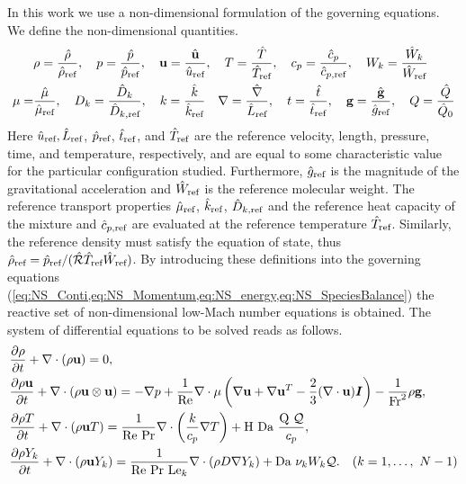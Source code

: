 In this work we use a non-dimensional formulation of the governing equations. We define the non-dimensional quantities.
\begin{align*}
&\rho = \frac{\hat \rho}{\hat \rho_{\text{ref}}}, \quad 
p = \frac{\hat p}{\hat p_{\text{ref}}}, \quad 
\textbf{u}= \frac{\hat{\textbf{u}}}{\hat u_{\text{ref}}}, \quad 
T = \frac{\hat T}{\hat T_{\text{ref}}},  \quad 
c_p = \frac{\hat c_p}{\hat c_{p,\text{ref}}}, \quad
W_k = \frac{\hat{W}_k}{\hat W_{\text{ref}}}
\\
\mu = &\frac{\hat \mu}{\hat \mu_{\text{ref}}},\quad
D_k = \frac{\hat D_k}{\hat D_{k,\text{ref}}}, \quad
k = \frac{\hat k}{\hat k_{\text{ref}}}\quad
\nabla = \frac{\hat \nabla}{\hat L_{\text{ref}}}, \quad
t = \frac{\hat{t}}{\hat t_{\text{ref}}},\quad 
\textbf{g} = \frac{\hat{\textbf{g}}}{\hat g_{\text{ref}}},\quad
Q = \frac{\hat Q}{\hat{Q}_0}
\end{align*}
Here $\hat u_{\text{ref}}, \hat L_{\text{ref}}$, $\hat p_{\text{ref}}$, $\hat t_{\text{ref}}$, and $\hat T_{\text{ref}}$ are the reference velocity, length, pressure, time, and temperature, respectively, and are equal to some characteristic value for the particular configuration studied. Furthermore, $\hat g_{\text{ref}}$ is the magnitude of the gravitational acceleration and $\hat W_{\text{ref}}$ is the reference molecular weight. The reference transport properties $\hat \mu_{\text{ref}}$, $\hat k_{\text{ref}}$, $\hat D_{k,\text{ref}}$ and the reference heat capacity of the mixture and $\hat c_{p,\text{ref}}$ are evaluated at the reference temperature $\hat T_{\text{ref}}$. Similarly, the reference density must satisfy the equation of state, thus $\hat \rho_{\text{ref}} = \hat p_{\text{ref}}/(\hat{\mathcal{R}}\hat T_{\text{ref}}\hat W_{\text{ref}})$.  By introducing these definitions into the governing equations (\cref{eq:NS_Conti,eq:NS_Momentum,eq:NS_energy,eq:NS_SpeciesBalance}) the reactive set of non-dimensional low-Mach number equations is obtained. The system of differential equations to be solved reads as follows. 
\begin{subequations}
	\begin{align}
&\frac{\partial \rho}{\partial t} + \nabla \cdot (\rho \textbf{u})   = 0, \label{eq:LowMach_Conti}\\
&\frac{\partial \rho \textbf{u}}{\partial t} + \nabla \cdot (\rho \textbf{u} \otimes \textbf{u})   = - \nabla p + \frac{1}{\text{Re}}\nabla \cdot \mu\left( \nabla \textbf{u} +\nabla \textbf{u}^T  - \frac{2}{3}(\nabla\cdot \textbf{u})\boldsymbol I \right)  - \frac{1}{\text{Fr}^2}\rho\textbf{g}, \label{eq:LowMach_Momentum}\\
&\frac{\partial \rho T}{\partial t} + \nabla \cdot (\rho \textbf{u} T)  = \frac{1}{\text{Re}~\text{Pr}}\nabla \cdot\left(\frac{k}{c_p} \nabla T\right)+ \text{H}~\text{Da}~\frac{\mathrm{Q}~\mathcal{Q}}{c_p}, \label{eq:LowMachEnergy}\\ 
&\frac{\partial \rho Y_k}{\partial t} +	\nabla \cdot (\rho  \textbf{u}Y_k)   = \frac{1}{\text{Re}~\text{Pr}~\text{Le}_k}\nabla \cdot(\rho D \nabla Y_k)+  \text{Da}~\nu_k W_k \mathcal{Q}. \quad (k = 1, \dots,~N - 1) \label{eq:LowMachMassBalance} 
	\end{align}
	\label{eq:all-eq}
\end{subequations}
